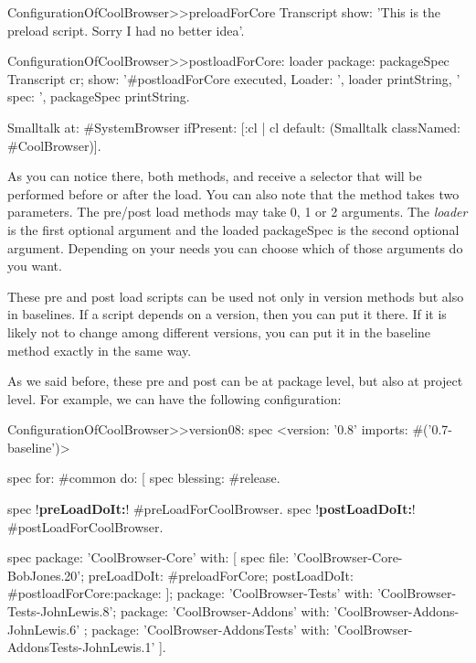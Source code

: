 \documentclass[a4paper,10pt,twoside]{book}
\begin{document}
\begin{code}{}
ConfigurationOfCoolBrowser>>preloadForCore
         Transcript show: 'This is the preload script. Sorry I had no better idea'.
\end{code}

\begin{code}{}
ConfigurationOfCoolBrowser>>postloadForCore: loader package: packageSpec
       Transcript cr;
              show: '#postloadForCore executed, Loader: ', loader printString,
                     ' spec: ', packageSpec printString.

       Smalltalk at: #SystemBrowser ifPresent: [:cl | cl default: (Smalltalk classNamed: #CoolBrowser)].
\end{code}

As you can notice there, both methods,  and  receive a selector that will be performed before or after the load. You can also note that the method   takes two parameters. The pre/post load methods may take 0, 1 or 2 arguments. The {\em loader} %
is the first optional argument and the loaded packageSpec is the second optional argument. Depending on your needs you can choose which of those arguments do you want.

These pre and post load scripts can be used not only in version methods but also in baselines. If a script depends on a version, then you can put it there. If it is likely not to change among different versions, you can put it in the baseline method exactly in the same way.

As we said before, these pre and post can be at package level, but also at project level. For example, we can have the following configuration:

\begin{code}{}
ConfigurationOfCoolBrowser>>version08: spec
       <version: '0.8' imports: #('0.7-baseline')>

       spec for: #common do: [
              spec blessing: #release.

              spec !\textbf{preLoadDoIt:}! #preLoadForCoolBrowser.
              spec !\textbf{postLoadDoIt:}! #postLoadForCoolBrowser.

              spec
                     package: 'CoolBrowser-Core' with: [
                            spec
                                   file: 'CoolBrowser-Core-BobJones.20';
                                   preLoadDoIt: #preloadForCore;
                                   postLoadDoIt: #postloadForCore:package: ];
                     package: 'CoolBrowser-Tests' with: 'CoolBrowser-Tests-JohnLewis.8';
                     package: 'CoolBrowser-Addons' with: 'CoolBrowser-Addons-JohnLewis.6' ;
                     package: 'CoolBrowser-AddonsTests' with: 'CoolBrowser-AddonsTests-JohnLewis.1' ].
\end{code}
\end{document}
